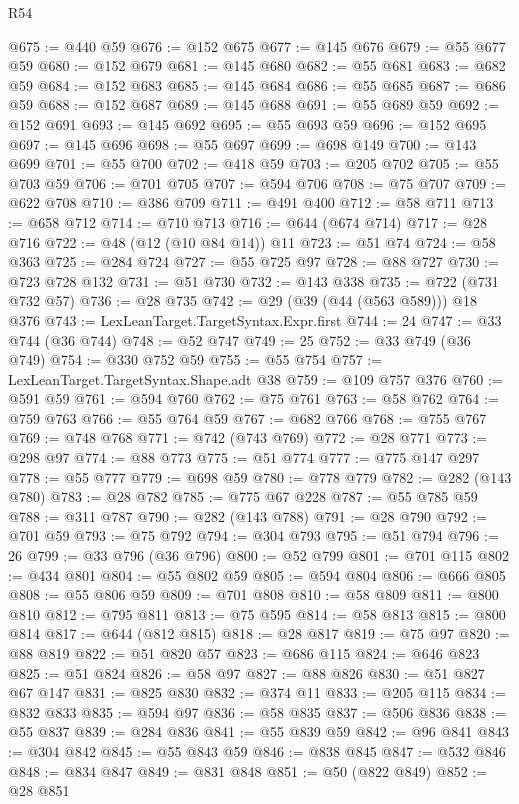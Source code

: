 \begin{lexlean}{R54}
\begin{coremodule}
@675 := @440 @59
@676 := @152 @675
@677 := @145 @676
@679 := @55 @677 @59
@680 := @152 @679
@681 := @145 @680
@682 := @55 @681
@683 := @682 @59
@684 := @152 @683
@685 := @145 @684
@686 := @55 @685
@687 := @686 @59
@688 := @152 @687
@689 := @145 @688
@691 := @55 @689 @59
@692 := @152 @691
@693 := @145 @692
@695 := @55 @693 @59
@696 := @152 @695
@697 := @145 @696
@698 := @55 @697
@699 := @698 @149
@700 := @143 @699
@701 := @55 @700
@702 := @418 @59
@703 := @205 @702
@705 := @55 @703 @59
@706 := @701 @705
@707 := @594 @706
@708 := @75 @707
@709 := @622 @708
@710 := @386 @709
@711 := @491 @400
@712 := @58 @711
@713 := @658 @712
@714 := @710 @713
@716 := @644 (@674 @714)
@717 := @28 @716
@722 := @48 (@12 (@10 @84 @14)) @11
@723 := @51 @74
@724 := @58 @363
@725 := @284 @724
@727 := @55 @725 @97
@728 := @88 @727
@730 := @723 @728 @132
@731 := @51 @730
@732 := @143 @338
@735 := @722 (@731 @732 @57)
@736 := @28 @735
@742 := @29 (@39 (@44 (@563 @589))) @18 @376
@743 := LexLeanTarget.TargetSyntax.Expr.first
@744 := 24
@747 := @33 @744 (@36 @744)
@748 := @52 @747
@749 := 25
@752 := @33 @749 (@36 @749)
@754 := @330 @752 @59
@755 := @55 @754
@757 := LexLeanTarget.TargetSyntax.Shape.adt @38
@759 := @109 @757 @376
@760 := @591 @59
@761 := @594 @760
@762 := @75 @761
@763 := @58 @762
@764 := @759 @763
@766 := @55 @764 @59
@767 := @682 @766
@768 := @755 @767
@769 := @748 @768
@771 := @742 (@743 @769)
@772 := @28 @771
@773 := @298 @97
@774 := @88 @773
@775 := @51 @774
@777 := @775 @147 @297
@778 := @55 @777
@779 := @698 @59
@780 := @778 @779
@782 := @282 (@143 @780)
@783 := @28 @782
@785 := @775 @67 @228
@787 := @55 @785 @59
@788 := @311 @787
@790 := @282 (@143 @788)
@791 := @28 @790
@792 := @701 @59
@793 := @75 @792
@794 := @304 @793
@795 := @51 @794
@796 := 26
@799 := @33 @796 (@36 @796)
@800 := @52 @799
@801 := @701 @115
@802 := @434 @801
@804 := @55 @802 @59
@805 := @594 @804
@806 := @666 @805
@808 := @55 @806 @59
@809 := @701 @808
@810 := @58 @809
@811 := @800 @810
@812 := @795 @811
@813 := @75 @595
@814 := @58 @813
@815 := @800 @814
@817 := @644 (@812 @815)
@818 := @28 @817
@819 := @75 @97
@820 := @88 @819
@822 := @51 @820 @57
@823 := @686 @115
@824 := @646 @823
@825 := @51 @824
@826 := @58 @97
@827 := @88 @826
@830 := @51 @827 @67 @147
@831 := @825 @830
@832 := @374 @11
@833 := @205 @115
@834 := @832 @833
@835 := @594 @97
@836 := @58 @835
@837 := @506 @836
@838 := @55 @837
@839 := @284 @836
@841 := @55 @839 @59
@842 := @96 @841
@843 := @304 @842
@845 := @55 @843 @59
@846 := @838 @845
@847 := @532 @846
@848 := @834 @847
@849 := @831 @848
@851 := @50 (@822 @849)
@852 := @28 @851

\end{coremodule}
\end{lexlean}
